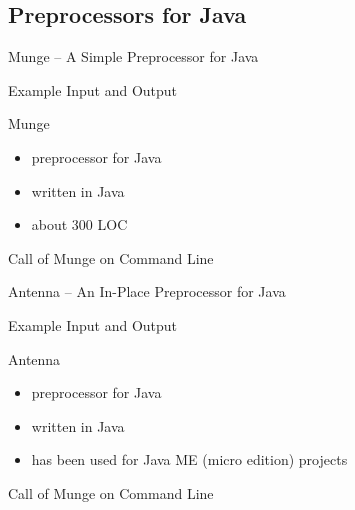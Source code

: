 


\subsection{Preprocessors for Java}

\begin{frame}{Munge -- A Simple Preprocessor for Java \mytitlesource{\featureide}}
	\begin{mycolumns}[T,widths={75}]
		\begin{exampletight}{Example Input and Output}
			\centering{}
		\end{exampletight}
	\mynextcolumn
		\begin{note}{Munge}
			\begin{itemize}
				\item preprocessor for Java
				\item written in Java
				\item about 300 LOC
			\end{itemize}
		\end{note}
	\end{mycolumns}

	\begin{exampletight}{Call of Munge on Command Line}
		\centering{}
	\end{exampletight}
\end{frame}

\begin{frame}{Antenna -- An In-Place Preprocessor for Java \mytitlesource{\featureide}}
	\begin{mycolumns}[T,widths={75}]
		\begin{exampletight}{Example Input and Output}
			\centering{}
		\end{exampletight}
	\mynextcolumn
		\begin{note}{Antenna}
			\begin{itemize}
				\item preprocessor for Java
				\item written in Java
				\item has been used for Java ME (micro edition) projects
			\end{itemize}
		\end{note}
	\end{mycolumns}

	\begin{exampletight}{Call of Munge on Command Line}
		\centering{}
	\end{exampletight}
\end{frame}

